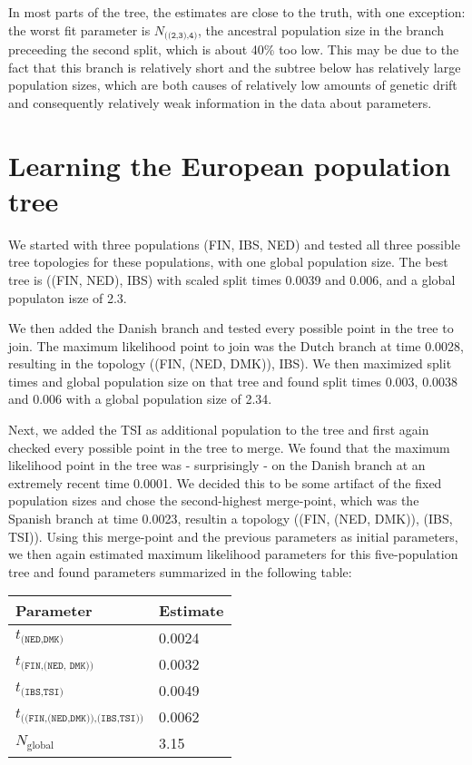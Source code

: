 \documentclass[a4paper]{article}
\begin{document}
In most parts of the tree, the estimates are close to the truth, with one exception: the worst fit parameter is $N_\texttt{((2,3),4)}$, the ancestral population size in the branch preceeding the second split, which is about 40\% too low. This may be due to the fact that this branch is relatively short and the subtree below has relatively large population sizes, which are both causes of relatively low amounts of genetic drift and consequently relatively weak information in the data about parameters.

\section*{Learning the European population tree}

We started with three populations (FIN, IBS, NED) and tested all three possible tree topologies for these populations, with one global population size. The best tree is ((FIN, NED), IBS) with scaled split times 0.0039 and 0.006, and a global populaton isze of 2.3.

We then added the Danish branch and tested every possible point in the tree to join. The maximum likelihood point to join was the Dutch branch at time 0.0028, resulting in the topology ((FIN, (NED, DMK)), IBS). We then maximized split times and global population size on that tree and found split times 0.003, 0.0038 and 0.006 with a global population size of 2.34.

Next, we added the TSI as additional population to the tree and first again checked every possible point in the tree to merge. We found that the maximum likelihood point in the tree was - surprisingly - on the Danish branch at an extremely recent time 0.0001. We decided this to be some artifact of the fixed population sizes and chose the second-highest merge-point, which was the Spanish branch at time 0.0023, resultin a topology ((FIN, (NED, DMK)), (IBS, TSI)). Using this merge-point and the previous parameters as initial parameters, we then again estimated maximum likelihood parameters for this five-population tree and found parameters summarized in the following table:

\begin{tabular}{ll}
    \textbf{Parameter} & \textbf{Estimate}\\ \hline
    $t_\texttt{(NED,DMK)}$ & 0.0024\\
    $t_\texttt{(FIN,(NED, DMK))}$ & 0.0032\\
    $t_\texttt{(IBS,TSI)}$ & 0.0049\\
    $t_\texttt{((FIN,(NED,DMK)),(IBS,TSI))}$ & 0.0062\\
    $N_\mathrm{global}$ & 3.15\\
\end{tabular}
\end{document}
